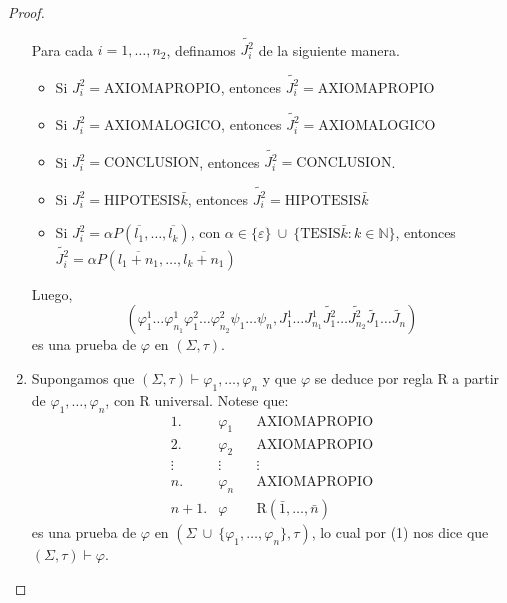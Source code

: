 \begin{proof}
\begin{enumerate}[(1)]
        \PN Para cada $i = 1, \dotsc, n_{2}$, definamos $\widetilde{J_{i}^{2}}$ de la siguiente manera.
        \begin{itemize}
          \item Si $J_{i}^{2} = \mathrm{AXIOMAPROPIO}$, entonces $\widetilde{J_{i}^{2}} = \mathrm{AXIOMAPROPIO}$
          \item Si $J_{i}^{2} = \mathrm{AXIOMALOGICO}$, entonces $\widetilde{J_{i}^{2}} = \mathrm{AXIOMALOGICO}$
          \item Si $J_{i}^{2} = \mathrm{CONCLUSION}$, entonces $\widetilde{J_{i}^{2}} = \mathrm{CONCLUSION}$.
          \item Si $J_{i}^{2} = \mathrm{HIPOTESIS}\bar{k}$, entonces $\widetilde{J_{i}^{2}} = \mathrm{HIPOTESIS}\bar{k}$
          \item Si $J_{i}^{2} = \alpha P(\overline{l_{1}}, \dotsc, \overline{l_{k}})$, con $\alpha \in \{\varepsilon\}
            \ \cup \ \{\mathrm{TESIS}\bar{k}: k \in \mathbb{N}\}$, entonces \linebreak $\widetilde{J_{i}^{2}} = \alpha
            P(\overline{l_{1} + n_{1}}, \dotsc, \overline{l_{k} + n_{1}})$
        \end{itemize}

        \PN Luego,
        \[
          (\varphi_{1}^{1} \dotsc \varphi_{n_{1}}^{1} \varphi_{1}^{2} \dotsc \varphi_{n_{2}}^{2} \psi_{1} \dotsc
          \psi_{n}, J_{1}^{1} \dotsc J_{n_{1}}^{1} \widetilde{J_{1}^{2}} \dotsc \widetilde{J_{n_{2}}^{2}}
          \widetilde{J_{1}} \dotsc \widetilde{J_{n}})
        \]
        \PN es una prueba de $\varphi$ en $(\Sigma, \tau)$.

      \item Supongamos que $(\Sigma, \tau) \vdash \varphi_{1}, \dotsc, \varphi_{n}$ y que $\varphi$ se deduce por regla
        R a partir de $\varphi_{1}, \dotsc, \varphi_{n}$, con R universal. Notese que:
        \[
          \begin{array}{llll}
            1. & \varphi_{1} && \text{AXIOMAPROPIO} \\
            2. & \varphi_{2} && \text{AXIOMAPROPIO} \\
            \vdots & \vdots && \vdots \\
            n. & \varphi_{n} && \text{AXIOMAPROPIO} \\
            n+1. & \varphi && \text{R}(\bar{1}, \dotsc, \bar{n})
          \end{array}
        \]
        \PN es una prueba de $\varphi$ en $(\Sigma \ \cup \ \{\varphi_{1}, \dotsc, \varphi_{n}\}, \tau)$, lo cual por
        (1) nos dice que $(\Sigma, \tau) \vdash \varphi$.


\end{enumerate}
\end{proof}
